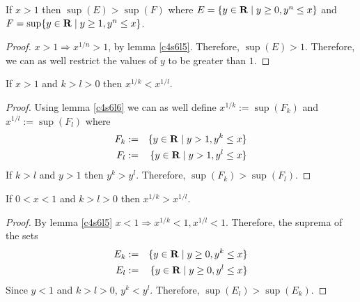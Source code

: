 \begin{lem}\label{c4s6l6}
If $x > 1$ then $\sup(E) > \sup(F)$ where $E = \{y \in \mathbf{R} \;|\; y \ge 0,
y^n \le x\}$ and $F = \sup\{y\in \mathbf{R} \;|\; y \ge 1, y^n \le x\}$.
\end{lem}
\begin{proof}
$x > 1 \Rightarrow x^{1/n} > 1$, by lemma \ref{c4s6l5}. Therefore, $\sup
(E) > 1$. Therefore, we can as well restrict the values of $y$ to be 
greater than $1$.
\end{proof}

\begin{lem}\label{c4s6l7}
If $x > 1$ and $k > l > 0$ then $x^{1/k} < x^{1/l}$.
\end{lem}
\begin{proof}
Using lemma \ref{c4s6l6} we can as well define $x^{1/k} := \sup(F_k)$ and
$x^{1/l} := \sup(F_l)$ where
\begin{eqnarray}
F_k &:=& \{y \in \mathbf{R} \;|\; y > 1, y^k \le x\} \\
F_l &:=& \{y \in \mathbf{R} \;|\; y > 1, y^l \le x\} 
\end{eqnarray}
If $k > l$ and $y > 1$ then $y^k > y^l$. Therefore, $\sup(F_k) > 
\sup(F_l)$.
\end{proof}

\begin{lem}\label{c4s6l8}
If $0 < x < 1$ and $k > l > 0$ then $x^{1/k} > x^{1/l}$.
\end{lem}
\begin{proof}
By lemma \ref{c4s6l5} $x < 1 \Rightarrow x^{1/k} < 1, x^{1/l} < 1$. 
Therefore, the suprema of the sets
\begin{eqnarray}
E_k &:=& \{y \in \mathbf{R} \;|\; y \ge 0, y^k \le x\} \\
E_l &:=& \{y \in \mathbf{R} \;|\; y \ge 0, y^l \le x\} 
\end{eqnarray}
Since $y < 1$ and $k > l > 0$, $y^k < y^l$. Therefore, $\sup(E_l) >
\sup(E_k)$.
\end{proof}

